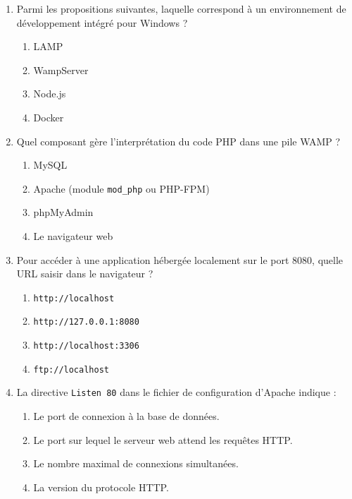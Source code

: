 \documentclass[11pt]{article}
\begin{document}
\begin{exercice}
\begin{enumerate}
    \item Parmi les propositions suivantes, laquelle correspond à un environnement de développement intégré pour Windows ?
    \begin{enumerate}
        \item LAMP
        \item WampServer
        \item Node.js
        \item Docker
    \end{enumerate}
    \item Quel composant gère l'interprétation du code PHP dans une pile WAMP ?
    \begin{enumerate}
        \item MySQL
        \item Apache (module \texttt{mod\_php} ou PHP-FPM)
        \item phpMyAdmin
        \item Le navigateur web
    \end{enumerate}
    \item Pour accéder à une application hébergée localement sur le port 8080, quelle URL saisir dans le navigateur ?
    \begin{enumerate}
        \item \texttt{http://localhost}
        \item \texttt{http://127.0.0.1:8080}
        \item \texttt{http://localhost:3306}
        \item \texttt{ftp://localhost}
    \end{enumerate}
    \item La directive \texttt{Listen 80} dans le fichier de configuration d'Apache indique :
    \begin{enumerate}
        \item Le port de connexion à la base de données.
        \item Le port sur lequel le serveur web attend les requêtes HTTP.
        \item Le nombre maximal de connexions simultanées.
        \item La version du protocole HTTP.
    \end{enumerate}
\end{enumerate}
\end{exercice}
\end{document}
